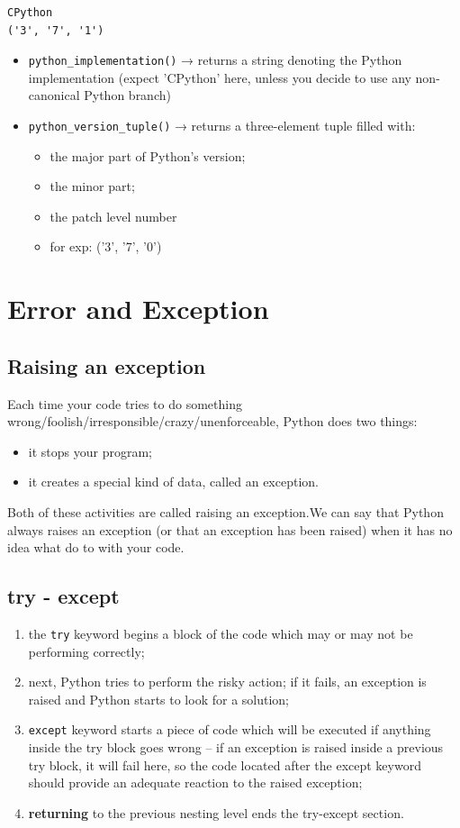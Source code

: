\documentclass[11pt]{article}
\begin{document}
\begin{verbatim}
CPython
('3', '7', '1')
\end{verbatim}

\begin{itemize}
\item \texttt{python\_implementation()} → returns a string denoting the Python
implementation (expect 'CPython' here, unless you decide to use any
non-canonical Python branch)
\item \texttt{python\_version\_tuple()} → returns a three-element tuple filled with:
\begin{itemize}
\item the major part of Python’s version;
\item the minor part;
\item the patch level number
\item for exp:  ('3', '7', '0')
\end{itemize}
\end{itemize}

\section{Error and Exception}
\label{sec:org90d47f7}
\subsection{Raising an exception}
\label{sec:org99185c1}
Each time your code tries to do something
wrong/foolish/irresponsible/crazy/unenforceable, Python does two
things:

\begin{itemize}
\item it stops your program;
\item it creates a special kind of data, called an exception.
\end{itemize}

Both of these activities are called raising an exception.We can say
that Python always raises an exception (or that an exception has been
raised) when it has no idea what do to with your code.

\subsection{try - except}
\label{sec:orga91366f}
\begin{enumerate}
\item the \texttt{try} keyword begins a block of the code which may or may not be
performing correctly;
\item next, Python tries to perform the risky action; if it fails, an
exception is raised and Python starts to look for a solution;
\item \texttt{except} keyword starts a piece of code which will be executed if
anything inside the try block goes wrong – if an exception is
raised inside a previous try block, it will fail here, so the code
located after the except keyword should provide an adequate
reaction to the raised exception;
\item \textbf{returning} to the previous nesting level ends the try-except
section.
\end{enumerate}
\end{document}
